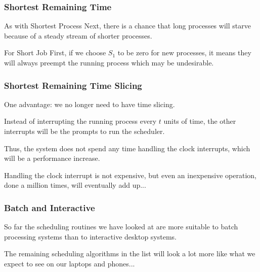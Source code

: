 \begin{frame}
\frametitle{Shortest Remaining Time}

As with Shortest Process Next, there is a chance that long processes will starve because of a steady stream of shorter processes. 

For Short Job First, if we choose $S_{1}$ to be zero for new processes, it means they will always preempt the running process which may be undesirable.


\end{frame}

\begin{frame}
\frametitle{Shortest Remaining Time Slicing}

One advantage: we no longer need to have time slicing. 

Instead of interrupting the running process every $t$ units of time, the other interrupts will be the prompts to run the scheduler. 

Thus, the system does not spend any time handling the clock interrupts, which will be a performance increase. 

Handling the clock interrupt is not expensive, but even an inexpensive operation, done a million times, will eventually add up...


\end{frame}



\begin{frame}
\frametitle{Batch and Interactive}

So far the scheduling routines we have looked at are more suitable to batch processing systems than to interactive desktop systems. 

The remaining scheduling algorithms in the list will look a lot more like what we expect to see on our laptops and phones...


\end{frame}




